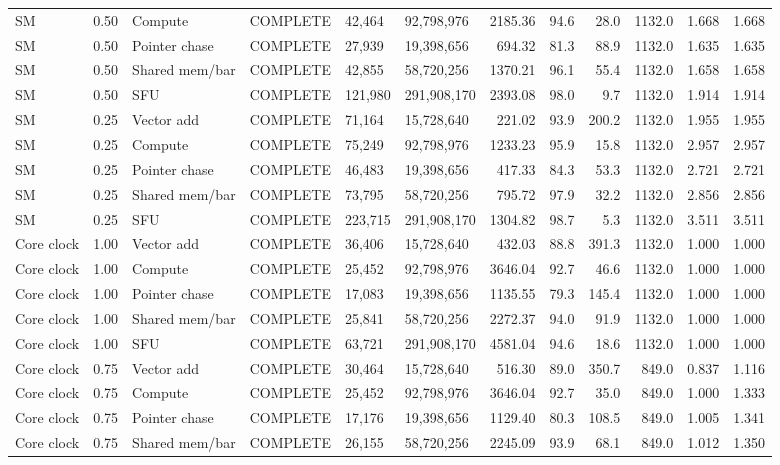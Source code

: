 \begin{landscape}
\begin{scriptsize}
\begin{longtable}{lllrllrrrrrr}
SM & 0.50 & Compute & COMPLETE & 42,464 & 92,798,976 & 2185.36 & 94.6 & 28.0 & 1132.0 & 1.668 & 1.668 \\
SM & 0.50 & Pointer chase & COMPLETE & 27,939 & 19,398,656 & 694.32 & 81.3 & 88.9 & 1132.0 & 1.635 & 1.635 \\
SM & 0.50 & Shared mem/bar & COMPLETE & 42,855 & 58,720,256 & 1370.21 & 96.1 & 55.4 & 1132.0 & 1.658 & 1.658 \\
SM & 0.50 & SFU & COMPLETE & 121,980 & 291,908,170 & 2393.08 & 98.0 & 9.7 & 1132.0 & 1.914 & 1.914 \\
SM & 0.25 & Vector add & COMPLETE & 71,164 & 15,728,640 & 221.02 & 93.9 & 200.2 & 1132.0 & 1.955 & 1.955 \\
SM & 0.25 & Compute & COMPLETE & 75,249 & 92,798,976 & 1233.23 & 95.9 & 15.8 & 1132.0 & 2.957 & 2.957 \\
SM & 0.25 & Pointer chase & COMPLETE & 46,483 & 19,398,656 & 417.33 & 84.3 & 53.3 & 1132.0 & 2.721 & 2.721 \\
SM & 0.25 & Shared mem/bar & COMPLETE & 73,795 & 58,720,256 & 795.72 & 97.9 & 32.2 & 1132.0 & 2.856 & 2.856 \\
SM & 0.25 & SFU & COMPLETE & 223,715 & 291,908,170 & 1304.82 & 98.7 & 5.3 & 1132.0 & 3.511 & 3.511 \\
Core clock & 1.00 & Vector add & COMPLETE & 36,406 & 15,728,640 & 432.03 & 88.8 & 391.3 & 1132.0 & 1.000 & 1.000 \\
Core clock & 1.00 & Compute & COMPLETE & 25,452 & 92,798,976 & 3646.04 & 92.7 & 46.6 & 1132.0 & 1.000 & 1.000 \\
Core clock & 1.00 & Pointer chase & COMPLETE & 17,083 & 19,398,656 & 1135.55 & 79.3 & 145.4 & 1132.0 & 1.000 & 1.000 \\
Core clock & 1.00 & Shared mem/bar & COMPLETE & 25,841 & 58,720,256 & 2272.37 & 94.0 & 91.9 & 1132.0 & 1.000 & 1.000 \\
Core clock & 1.00 & SFU & COMPLETE & 63,721 & 291,908,170 & 4581.04 & 94.6 & 18.6 & 1132.0 & 1.000 & 1.000 \\
Core clock & 0.75 & Vector add & COMPLETE & 30,464 & 15,728,640 & 516.30 & 89.0 & 350.7 & 849.0 & 0.837 & 1.116 \\
Core clock & 0.75 & Compute & COMPLETE & 25,452 & 92,798,976 & 3646.04 & 92.7 & 35.0 & 849.0 & 1.000 & 1.333 \\
Core clock & 0.75 & Pointer chase & COMPLETE & 17,176 & 19,398,656 & 1129.40 & 80.3 & 108.5 & 849.0 & 1.005 & 1.341 \\
Core clock & 0.75 & Shared mem/bar & COMPLETE & 26,155 & 58,720,256 & 2245.09 & 93.9 & 68.1 & 849.0 & 1.012 & 1.350 \\

\end{longtable}
\end{scriptsize}
\end{landscape}

